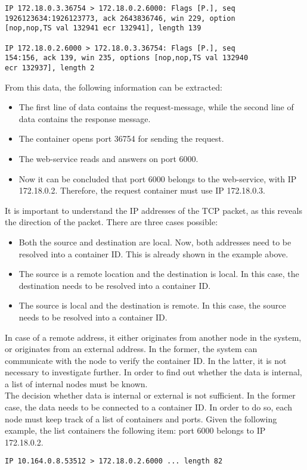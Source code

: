 \begin{verbatim}
IP 172.18.0.3.36754 > 172.18.0.2.6000: Flags [P.], seq
1926123634:1926123773, ack 2643836746, win 229, option
[nop,nop,TS val 132941 ecr 132941], length 139

IP 172.18.0.2.6000 > 172.18.0.3.36754: Flags [P.], seq
154:156, ack 139, win 235, options [nop,nop,TS val 132940 
ecr 132937], length 2
\end{verbatim}
From this data, the following information can be extracted:
\begin{itemize}
    \item The first line of data contains the request-message, while the second line of data contains the response message.    
    \item The container opens port 36754 for sending the request.
    \item The web-service reads and answers on port 6000.
    \item Now it can be concluded that port 6000 belongs to the web-service, with IP 172.18.0.2. Therefore, the request container must use IP 172.18.0.3.
\end{itemize}
It is important to understand the IP addresses of the TCP packet, as this reveals the direction of the packet. There are three cases possible:
\begin{itemize}
    \item Both the source and destination are local. Now, both addresses need to be resolved into a container ID. This is already shown in the example above.
    \item The source is a remote location and the destination is local. In this case, the destination needs to be resolved into a container ID.
    \item The source is local and the destination is remote. In this case, the source needs to be resolved into a container ID.
\end{itemize}

\noindent
In case of a remote address, it either originates from another node in the system, or originates from an external address. In the former, the system can communicate with the node to verify the container ID. In the latter, it is not necessary to investigate further. In order to find out whether the data is internal, a list of internal nodes must be known.\\

\noindent
The decision whether data is internal or external is not sufficient. In the former case, the data needs to be connected to a container ID. In order to do so, each node must keep track of a list of containers and ports. Given the following example, the list containers the following item: port 6000 belongs to IP 172.18.0.2.
\begin{verbatim}
IP 10.164.0.8.53512 > 172.18.0.2.6000 ... length 82
\end{verbatim}

